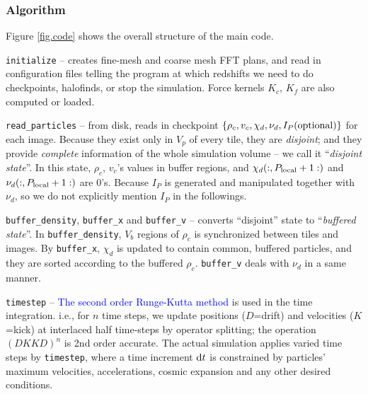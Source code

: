 \documentclass[10pt,twocolumn,preprint]{emulateapj}
\newcommand{\tcb}{\textcolor{blue}}
\begin{document}
\subsubsection{Algorithm}\label{sss.algorithm}
Figure \ref{fig.code} shows the overall structure of the main code.

{\tt initialize} -- creates fine-mesh and coarse mesh FFT plans, and read in configuration files telling the program at which redshifts we need to do checkpoints, halofinds, or stop the simulation. Force kernels $K_c$, $K_f$ are also computed or loaded.

{\tt read\_particles} -- from disk, reads in checkpoint $\{\rho_c,v_c,\chi_d,\nu_d,I_P({\rm optional})\}$ for each image. Because they exist only in $V_p$ of every tile, they are {\it disjoint}; and they provide {\it complete} information of the whole simulation volume -- we call it ``{\it disjoint state}''. In this state, $\rho_c$, $v_c$'s values in buffer regions, and $\chi_d(:,P_{\rm local}+1:)$ and $\nu_d(:,P_{\rm local}+1:)$ are 0's. Because $I_P$ is generated and manipulated together with $\nu_d$, so we do not explicitly mention $I_P$ in the followings.

{\tt buffer\_density}, {\tt buffer\_x} and {\tt buffer\_v} -- converts ``disjoint'' state to ``{\it buffered state}''. In {\tt buffer\_density}, $V_b$ regions of $\rho_c$ is synchronized between tiles and images. By {\tt buffer\_x}, $\chi_d$ is updated to contain common, buffered particles, and they are sorted according to the buffered $\rho_c$. {\tt buffer\_v} deals with $\nu_d$ in a same manner.

{\tt timestep} --
\tcb{The second order Runge-Kutta method} is used in the time integration. i.e., for $n$ time steps, we update positions ($D$=drift) and velocities ($K$=kick) at interlaced half time-steps by operator splitting; the operation $(DKKD)^n$ is 2nd order accurate. The actual simulation applies varied time steps by {\tt timestep}, where a time increment ${\rm d}t$ is constrained by particles' maximum velocities, accelerations, cosmic expansion and any other desired conditions.
\end{document}
